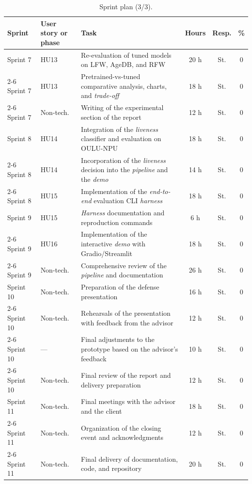 \documentclass[
  11pt, %
]{charter}
\begin{document}
\begin{table}[htpb]
  \centering
  \caption{Sprint plan (3/3).}
  \begin{tabularx}{\linewidth}{@{}|l|X|X|c|c|c|@{}}
    \hline
    \rowcolor[HTML]{C0C0C0}
    Sprint & User story or phase & Task & Hours & Resp. & \% \\ \hline

    Sprint 7 & HU13 & Re-evaluation of tuned models on LFW, AgeDB, and RFW & 20 h & St. & 0 \\ \cline{2-6}
    Sprint 7 & HU13 & Pretrained-vs-tuned comparative analysis, charts, and \textit{trade-off} & 18 h & St. & 0 \\ \cline{2-6}
    Sprint 7 & Non-tech. & Writing of the experimental section of the report & 12 h & St. & 0 \\ \hline

    Sprint 8 & HU14 & Integration of the \textit{liveness} classifier and evaluation on OULU-NPU & 18 h & St. & 0 \\ \cline{2-6}
    Sprint 8 & HU14 & Incorporation of the \textit{liveness} decision into the \textit{pipeline} and the \textit{demo} & 14 h & St. & 0 \\ \cline{2-6}
    Sprint 8 & HU15 & Implementation of the \textit{end-to-end} evaluation CLI \textit{harness} & 18 h & St. & 0 \\ \hline

    Sprint 9 & HU15 & \textit{Harness} documentation and reproduction commands & 6 h & St. & 0 \\ \cline{2-6}
    Sprint 9 & HU16 & Implementation of the interactive \textit{demo} with Gradio/Streamlit & 18 h & St. & 0 \\ \cline{2-6}
    Sprint 9 & Non-tech. & Comprehensive review of the \textit{pipeline} and documentation & 26 h & St. & 0 \\ \hline

    Sprint 10 & Non-tech. & Preparation of the defense presentation & 16 h & St. & 0 \\ \cline{2-6}
    Sprint 10 & Non-tech. & Rehearsals of the presentation with feedback from the advisor & 12 h & St. & 0 \\ \cline{2-6}
    Sprint 10 & --- & Final adjustments to the prototype based on the advisor's feedback & 10 h & St. & 0 \\ \cline{2-6}
    Sprint 10 & Non-tech. & Final review of the report and delivery preparation & 12 h & St. & 0 \\ \hline

    Sprint 11 & Non-tech. & Final meetings with the advisor and the client & 18 h & St. & 0 \\ \cline{2-6}
    Sprint 11 & Non-tech. & Organization of the closing event and acknowledgments & 12 h & St. & 0 \\ \cline{2-6}
    Sprint 11 & Non-tech. & Final delivery of documentation, code, and repository & 20 h & St. & 0 \\ \hline

  \end{tabularx}
\end{table}
\end{document}
